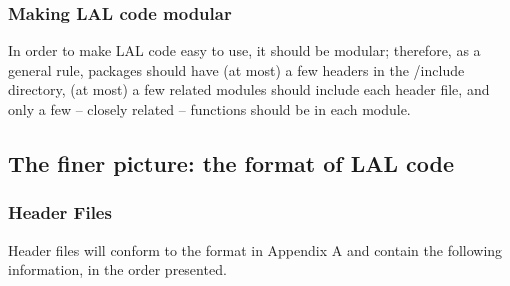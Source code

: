 \documentclass[]{ligodcc}
\begin{document}
\subsubsection{Making LAL code modular}

In order to make LAL code easy to use, it should be modular;
therefore, as a general rule, packages should have (at most) a few
headers in the /include directory, (at most) a few  related modules
should include each header file,  and only a few -- closely related
-- functions should be in each module.


\subsection{The finer picture: the format of LAL code}

\subsubsection{Header Files}

Header files  will conform to the format in Appendix A and contain the
following information, in the order presented.
\end{document}
